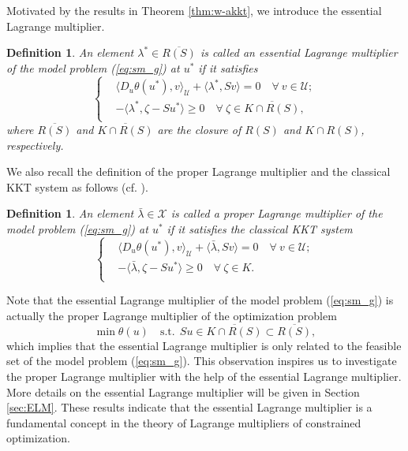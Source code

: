 \documentclass[leqno]{amsart}
\newtheorem{Definition}[Theorem]{Definition}
\theoremstyle{definition}
\begin{document}
Motivated by the results in Theorem \ref{thm:w-akkt}, we introduce the essential Lagrange multiplier.
\begin{Definition}\label{def:elm}
An element $\lambda^*\in \overline{R(S)}$ is called an essential Lagrange multiplier of the model problem (\ref{eq:sm_g}) at $u^*$ if it satisfies
\begin{equation}\label{eq:elm}
\left\{
\begin{aligned}
& \langle D_u\theta(u^*), v\rangle_\mathcal{U}  + \langle \lambda^{*}, Sv\rangle = 0\quad \forall\ v\in \mathcal{U};\\
& - \langle\lambda^{*} ,\zeta - Su^*\rangle\geq 0\quad \forall\ \zeta\in \overline{K\cap R(S)},\\
\end{aligned}
\right.
\end{equation}
where $\overline{R(S)}$ and $\overline{K\cap R(S)}$ are the closure of $R(S)$ and $K\cap R(S)$, respectively.
\end{Definition}
\noindent We also recall the definition of the proper Lagrange multiplier and the classical KKT system as follows (cf. \cite[p. 160]{barbu2012convexity}).
\begin{Definition}\label{def:plm}
An element $\bar{\lambda}\in \mathcal{X}$ is called a proper Lagrange multiplier of the model problem (\ref{eq:sm_g}) at $u^*$ if it satisfies the classical KKT system
\begin{equation}\label{eq:plm}
\left\{
\begin{aligned}
& \langle D_u\theta(u^*), v\rangle_\mathcal{U}  + \langle \bar{\lambda}, Sv\rangle = 0\quad \forall\ v\in \mathcal{U};\\
& - \langle\bar{\lambda} ,\zeta - Su^*\rangle\geq 0\quad \forall\ \zeta\in K.\\
\end{aligned}
\right.
\end{equation}
\end{Definition}

Note that the essential Lagrange multiplier of the model problem (\ref{eq:sm_g}) is actually the proper Lagrange multiplier of the optimization problem
\begin{equation}\nonumber
\min \theta(u)\quad \mbox{s.t.}\ \ Su \in \overline{K\cap R(S)}\subset \overline{R(S)},
\end{equation} 
which implies that the essential Lagrange multiplier is only related to the feasible set of the model problem (\ref{eq:sm_g}). This observation inspires us to investigate the proper Lagrange multiplier with the help of the essential Lagrange multiplier. More details on the essential Lagrange multiplier will be given in Section \ref{sec:ELM}. These results indicate that the essential Lagrange multiplier is a fundamental concept in the theory of Lagrange multipliers of constrained optimization.
\end{document}
